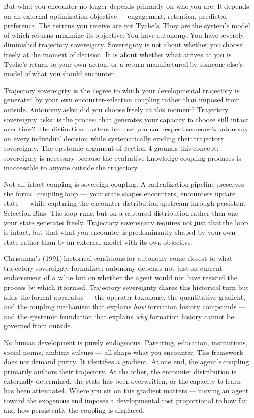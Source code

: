 \documentclass[
]{article}
\begin{document}
But what you encounter no longer depends primarily on who you are. It
depends on an external optimization objective --- engagement, retention,
predicted preference. The returns you receive are not Tyche's. They are
the system's model of which returns maximize its objective. You have
autonomy. You have severely diminished trajectory sovereignty.
Sovereignty is not about whether you choose freely at the moment of
decision. It is about whether what arrives at you is Tyche's return to
your own action, or a return manufactured by someone else's model of
what you should encounter.

Trajectory sovereignty is the degree to which your developmental
trajectory is generated by your own encounter-selection coupling rather
than imposed from outside. Autonomy asks: did you choose freely at this
moment? Trajectory sovereignty asks: is the process that generates your
capacity to choose still intact over time? The distinction matters
because you can respect someone's autonomy on every individual decision
while systematically eroding their trajectory sovereignty. The epistemic
argument of Section 4 grounds this concept: sovereignty is necessary
because the evaluative knowledge coupling produces is inaccessible to
anyone outside the trajectory.

Not all intact coupling is sovereign coupling. A radicalization pipeline
preserves the formal coupling loop --- your state shapes encounters,
encounters update state --- while capturing the encounter distribution
upstream through persistent Selection Bias. The loop runs, but on a
captured distribution rather than one your state generates freely.
Trajectory sovereignty requires not just that the loop is intact, but
that what you encounter is predominantly shaped by your own state rather
than by an external model with its own objective.

Christman's (1991) historical conditions for autonomy come closest to
what trajectory sovereignty formalizes: autonomy depends not just on
current endorsement of a value but on whether the agent would not have
resisted the process by which it formed. Trajectory sovereignty shares
this historical turn but adds the formal apparatus --- the operator
taxonomy, the quantitative gradient, and the coupling mechanism that
explains \emph{how} formation history compounds --- and the epistemic
foundation that explains \emph{why} formation history cannot be governed
from outside.

No human development is purely endogenous. Parenting, education,
institutions, social norms, ambient culture --- all shape what you
encounter. The framework does not demand purity. It identifies a
gradient. At one end, the agent's coupling primarily authors their
trajectory. At the other, the encounter distribution is externally
determined, the state has been overwritten, or the capacity to learn has
been attenuated. Where you sit on this gradient matters --- moving an
agent toward the exogenous end imposes a developmental cost proportional
to how far and how persistently the coupling is displaced.
\end{document}
